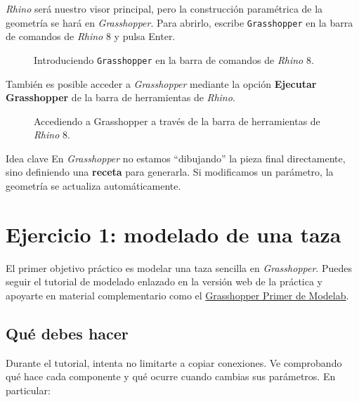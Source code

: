 \documentclass[
  spanish,
  11pt,
  a4paper,
  DIV=11,
  numbers=noendperiod]{scrartcl}
\begin{document}
\emph{Rhino} será nuestro visor principal, pero la construcción paramétrica de la geometría se hará en \emph{Grasshopper}. Para abrirlo, escribe \texttt{Grasshopper} en la barra de comandos de \emph{Rhino} 8 y pulsa Enter.

\begin{figure}[H]
\caption{Introduciendo \texttt{Grasshopper} en la barra de comandos de \emph{Rhino} 8.}\label{fig-command-line}
\end{figure}

También es posible acceder a \emph{Grasshopper} mediante la opción \textbf{Ejecutar Grasshopper} de la barra de herramientas de \emph{Rhino}.

\begin{figure}[H]
\caption{Accediendo a Grasshopper a través de la barra de herramientas de \emph{Rhino} 8.}\label{fig-toolbar}
\end{figure}

\begin{PracticeNoteBox}{Idea clave}
En \emph{Grasshopper} no estamos ``dibujando'' la pieza final directamente, sino definiendo una \textbf{receta} para generarla. Si modificamos un parámetro, la geometría se actualiza automáticamente.
\end{PracticeNoteBox}

\section{Ejercicio 1: modelado de una taza}
\label{ejercicio-1-modelado-de-una-taza}

El primer objetivo práctico es modelar una taza sencilla en \emph{Grasshopper}. Puedes seguir el tutorial de modelado enlazado en la versión web de la práctica y apoyarte en material complementario como el \href{https://modelab.gitbooks.io/grasshopper-primer/content/}{Grasshopper Primer de Modelab}.

\subsection{Qué debes hacer}
\label{que-debes-hacer-taza}

Durante el tutorial, intenta no limitarte a copiar conexiones. Ve comprobando qué hace cada componente y qué ocurre cuando cambias sus parámetros. En particular:
\end{document}
